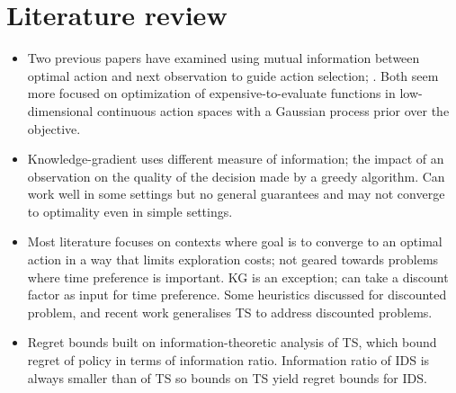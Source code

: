 \documentclass[11pt, openany]{book}
\begin{document}
\section{Literature review}
\begin{itemize}
    \item Two previous papers have examined using mutual information between optimal action and next observation to guide action selection; \cite{EntropySearchForInformationEfficientGlobalOptimization,AnInformationalApproachToTheGlobalOptimizationOfExpensiveToEvaluateFunctions}. Both seem more focused on optimization of expensive-to-evaluate functions in low-dimensional continuous action spaces with a Gaussian process prior over the objective.
    \item Knowledge-gradient uses different measure of information; the impact of an observation on the quality of the decision made by a greedy algorithm. Can work well in some settings but no general guarantees and may not converge to optimality even in simple settings.
    \item Most literature focuses on contexts where goal is to converge to an optimal action in a way that limits exploration costs; not geared towards problems where time preference is important. KG is an exception; can take a discount factor as input for time preference. Some heuristics discussed for discounted problem, and recent work generalises TS to address discounted problems.
    \item Regret bounds built on information-theoretic analysis of TS, which bound regret of policy in terms of information ratio. Information ratio of IDS is always smaller than of TS so bounds on TS yield regret bounds for IDS.
\end{itemize}
\end{document}
